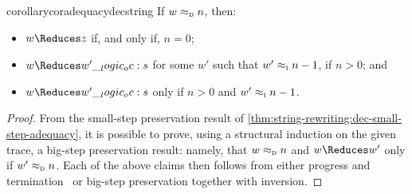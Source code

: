 \begin{restatable}[
  name=Big-step adequacy of decrements,
  label=cor:string-rewriting:dec-big-step-adequacy
]{corollary}{coradequacydecstring}
  If $w \approx\sb{\text{\normalfont\scshape d}} n$, then:
  \begin{itemize}[nosep]
  \item $w \Reduces z$ if, and only if, $n = 0$;
  \item $w \Reduces w' \oc s$ for some $w'$ such that $w' \approx\sb{\text{\normalfont\scshape i}} n-1$, if $n > 0$; and
  \item $w \Reduces w' \oc s$ only if $n > 0$ and $w' \approx\sb{\text{\normalfont\scshape i}} n-1$.
  \end{itemize}
\end{restatable}
\begin{proof}
  From the small-step preservation result of \cref{thm:string-rewriting:dec-small-step-adequacy}, it is possible to prove, using a structural induction on the given trace, a big-step preservation result: namely, that $w \approx\sb{\text{\normalfont\scshape d}} n$ and $w \Reduces w'$ only if $w' \approx\sb{\text{\normalfont\scshape d}} n$.
  Each of the above claims then follows from either progress and termination~ or big-step preservation together with inversion.
\end{proof}

% 

